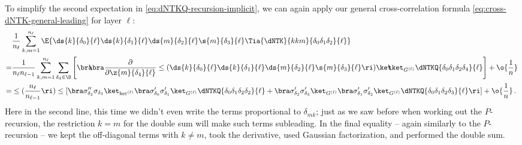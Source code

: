 To simplify the second expectation in \eqref{eq:dNTKQ-recursion-implicit}, we can again apply our general cross-correlation formula \eqref{eq:cross-dNTK-general-leading} for layer $\ell$:
\begin{align}
&\frac{1}{n_{\ell}}\sum_{k,m=1}^{n_{\ell}}\E{\ds{k}{\delta_0}{\ell}\ds{k}{\delta_1}{\ell}\ds{m}{\delta_2}{\ell}\s{m}{\delta_3}{\ell} \Tia{\dNTK}{kkm}{\delta_0\delta_1\delta_2}{\ell}}\, \\
=&\frac{1}{n_{\ell}n_{\ell-1}}\sum_{k,m=1}^{n_{\ell}}\sum_{\delta_4\in\D}\Bigg[\bra\!\!\!\bra\frac{\partial}{\partial \z{m}{\delta_4}{\ell}}\le(\ds{k}{\delta_0}{\ell}\ds{k}{\delta_1}{\ell}\ds{m}{\delta_2}{\ell}\s{m}{\delta_3}{\ell}\ri)\ket\!\!\!\ket_{G^{(\ell)}}\dNTKQ{\delta_0\delta_1\delta_2\delta_4}{\ell}\Bigg]+\o{\frac{1}{n}}\, \notag\\
=&\le(\frac{n_{\ell}}{n_{\ell-1}}\ri)\le[\bra\sigma^{\prime\prime}_{\delta_2}\sigma_{\delta_3}\ket_{\ker^{(\ell)}}\bra\sigma^{\prime}_{\delta_0}\sigma^{\prime}_{\delta_1}\ket_{G^{(\ell)}}\dNTKQ{\delta_0\delta_1\delta_2\delta_2}{\ell}+\bra\sigma^{\prime}_{\delta_2}\sigma^{\prime}_{\delta_3}\ket_{G^{(\ell)}}\bra\sigma^{\prime}_{\delta_1}\sigma^{\prime}_{\delta_2}\ket_{G^{(\ell)}}\dNTKQ{\delta_0\delta_1\delta_2\delta_3}{\ell}\ri]+\o{\frac{1}{n}}\, .\notag
\end{align}
Here in the second line, this time we didn't even write the terms proportional to $\delta_{mk}$; just as we saw before when working out the $P$-recursion, the restriction $k=m$ for the double sum will make such terms
subleading.
In the final equality -- again similarly to the $P$-recursion -- we kept the off-diagonal terms with $k\ne m$, took the derivative, used Gaussian factorization, and performed the double sum.


